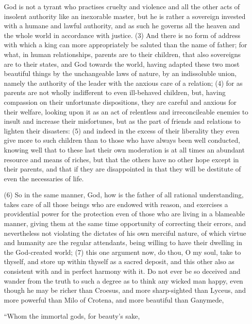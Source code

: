 God is not a tyrant who practises cruelty and violence and all the other acts of insolent authority
like an inexorable master, but he is rather a sovereign invested with a humane and lawful authority,
and as such he governs all the heaven and the whole world in accordance with justice. (3) And
there is no form of address with which a king can more appropriately be saluted than the name of
father; for what, in human relationships, parents are to their children, that also sovereigns are to
their states, and God towards the world, having adapted these two most beautiful things by the
unchangeable laws of nature, by an indissoluble union, namely the authority of the leader with the
anxious care of a relation; (4) for as parents are not wholly indifferent to even ill-behaved children,
but, having compassion on their unfortunate dispositions, they are careful and anxious for their
welfare, looking upon it as an act of relentless and irreconcileable enemies to insult and increase
their misfortunes, but as the part of friends and relations to lighten their disasters: (5) and indeed in
the excess of their liberality they even give more to such children than to those who have always
been well conducted, knowing well that to these last their own moderation is at all times an
abundant resource and means of riches, but that the others have no other hope except in their
parents, and that if they are disappointed in that they will be destitute of even the necessaries of
life.

(6) So in the same manner, God, how is the father of all rational understanding, takes care of all
those beings who are endowed with reason, and exercises a providential power for the protection
even of those who are living in a blameable manner, giving them at the same time opportunity of
correcting their errors, and nevertheless not violating the dictates of his own merciful nature, of
which virtue and humanity are the regular attendants, being willing to have their dwelling in the
God-created world; (7) this one argument now, do thou, O my soul, take to thyself, and store up
within thyself as a sacred deposit, and this other also as consistent with and in perfect harmony
with it. Do not ever be so deceived and wander from the truth to such a degree as to think any
wicked man happy, even though he may be richer than Croesus, and more sharp-sighted than
Lyceus, and more powerful than Milo of Crotena, and more beautiful than Ganymede,

``Whom the immortal gods, for beauty's sake,

